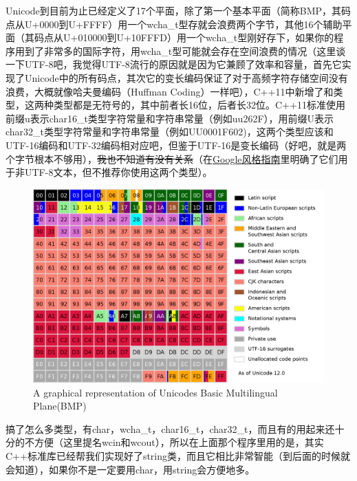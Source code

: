 Unicode到目前为止已经定义了17个平面，除了第一个基本平面（简称BMP，其码点从U+0000到U+FFFF）用一个wcha\_t型存就会浪费两个字节，其他16个辅助平面（其码点从U+010000到U+10FFFD）用一个wcha\_t型刚好存下，如果你的程序用到了非常多的国际字符，用wcha\_t型可能就会存在空间浪费的情况（这里谈一下UTF-8吧，我觉得UTF-8流行的原因就是因为它兼顾了效率和容量，首先它实现了Unicode中的所有码点，其次它的变长编码保证了对于高频字符存储空间没有浪费，大概就像哈夫曼编码（Huffman Coding）一样吧），C++11中新增了和类型，这两种类型都是无符号的，其中前者长16位，后者长32位。C++11标准使用前缀u表示char16\_t类型字符常量和字符串常量（例如u\leftqm\mybackslash u262F\rightqm），用前缀U表示char32\_t类型字符常量和字符串常量（例如U\leftqm\mybackslash U0001F602\rightqm)，这两个类型应该和UTF-16编码和UTF-32编码相对应吧，但鉴于UTF-16是变长编码（好吧，就是两个字节根本不够用），\sout{我也不知道有没有关系}（在\thinspace\href{https://github.com/google/styleguide}{Google风格指南}里明确了它们用于非UTF-8文本，但不推荐你使用这两个类型）。

\begin{figure}[!hbt]
\centering
\includegraphics[scale=0.3]{./Figures/Unicode BMP}
\caption{A graphical representation of Unicode\rightqm s Basic Multilingual Plane(BMP)}
\label{figure:Unicode BMP}
\end{figure}

搞了怎么多类型，有char，wcha\_t，char16\_t，char32\_t，而且有的用起来还十分的不方便（这里提名wcin和wcout），所以在上面那个程序里用的是，其实C++标准库已经帮我们实现好了string类，而且它相比非常智能（到后面的时候就会知道），如果你不是一定要用char，用string会方便地多。

